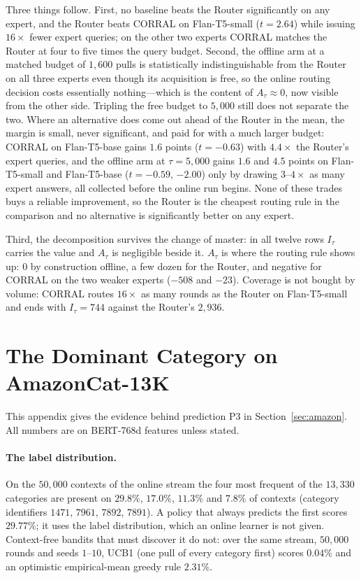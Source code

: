 \documentclass[anon]{alt2027} %
\begin{document}
Three things follow. First, no baseline beats the Router significantly on any
expert, and the Router beats CORRAL on Flan-T5-small ($t=2.64$) while issuing
$16\times$ fewer expert queries; on the other two experts CORRAL matches the
Router at four to five times the query budget. Second, the offline arm at a
matched budget of $1{,}600$ pulls is statistically indistinguishable from the
Router on all three experts even though its acquisition is free, so the online
routing decision costs essentially nothing---which is the content of
$A_\tau\approx0$, now visible from the other side. Tripling the free budget to
$5{,}000$ still does not separate the two. Where an alternative does come out
ahead of the Router in the mean, the margin is small, never significant, and
paid for with a much larger budget: CORRAL on Flan-T5-base gains $1.6$
points ($t=-0.63$) with $4.4\times$ the Router's expert queries, and the
offline arm at $\tau=5{,}000$ gains $1.6$ and $4.5$ points on Flan-T5-small
and Flan-T5-base ($t=-0.59$, $-2.00$) only by drawing $3$--$4\times$ as many
expert answers, all collected before the online run begins. None of these
trades buys a reliable improvement, so the Router is the cheapest routing rule in
the comparison and no alternative is significantly better on any expert.

Third, the decomposition survives the change of master: in all twelve rows
$I_\tau$ carries the value and $A_\tau$ is negligible beside it. $A_\tau$ is
where the routing rule shows up: $0$ by construction offline, a few dozen for
the Router, and negative for CORRAL on the two weaker experts ($-508$ and
$-23$). Coverage is not bought by volume: CORRAL routes $16\times$ as many
rounds as the Router on Flan-T5-small and ends with $I_\tau=744$ against the
Router's $2{,}936$.

\section{The Dominant Category on AmazonCat-13K}
\label{app:dominant}

This appendix gives the evidence behind prediction P3 in Section~\ref{sec:amazon}. All numbers are on BERT-768d features
unless stated.

\paragraph{The label distribution.}
On the $50{,}000$ contexts of the online stream the four most frequent of the
$13{,}330$ categories are present on $29.8\%$, $17.0\%$, $11.3\%$ and $7.8\%$
of contexts (category identifiers $1471$, $7961$, $7892$, $7891$). A policy
that always predicts the first scores $29.77\%$; it uses the label
distribution, which an online learner is not given. Context-free bandits that
must discover it do not: over the same stream, $50{,}000$ rounds and seeds
$1$--$10$, UCB1 (one pull of every category first) scores $0.04\%$ and an
optimistic empirical-mean greedy rule $2.31\%$.
\end{document}
